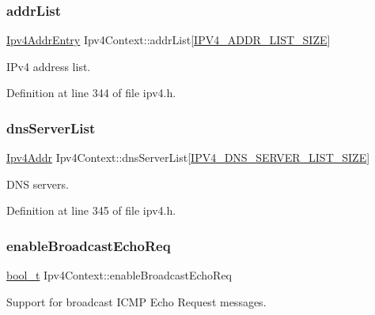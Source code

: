 \subsubsection{\texorpdfstring{addr\+List}{addrList}}
{\footnotesize\ttfamily \hyperlink{structIpv4AddrEntry}{Ipv4\+Addr\+Entry} Ipv4\+Context\+::addr\+List\mbox{[}\hyperlink{ipv4_8h_a360065ed2949f3d5f9f7e6ac4e9ad7e1}{I\+P\+V4\+\_\+\+A\+D\+D\+R\+\_\+\+L\+I\+S\+T\+\_\+\+S\+I\+ZE}\mbox{]}}



I\+Pv4 address list. 



Definition at line 344 of file ipv4.\+h.

\mbox{\label{structIpv4Context_a35af49229f86907500e3d181a95568be}} 
\subsubsection{\texorpdfstring{dns\+Server\+List}{dnsServerList}}
{\footnotesize\ttfamily \hyperlink{ipv4_8h_a411debb3d770caa0c06d3f73367da37f}{Ipv4\+Addr} Ipv4\+Context\+::dns\+Server\+List\mbox{[}\hyperlink{ipv4_8h_abc304c5d041be75e0bbe48aa44523487}{I\+P\+V4\+\_\+\+D\+N\+S\+\_\+\+S\+E\+R\+V\+E\+R\+\_\+\+L\+I\+S\+T\+\_\+\+S\+I\+ZE}\mbox{]}}



D\+NS servers. 



Definition at line 345 of file ipv4.\+h.

\mbox{\label{structIpv4Context_a4ed415170798301eb11150f65f10b9d4}} 
\subsubsection{\texorpdfstring{enable\+Broadcast\+Echo\+Req}{enableBroadcastEchoReq}}
{\footnotesize\ttfamily \hyperlink{compiler__port_8h_a812d16e5494522586b3784e55d479912}{bool\+\_\+t} Ipv4\+Context\+::enable\+Broadcast\+Echo\+Req}



Support for broadcast I\+C\+MP Echo Request messages. 



